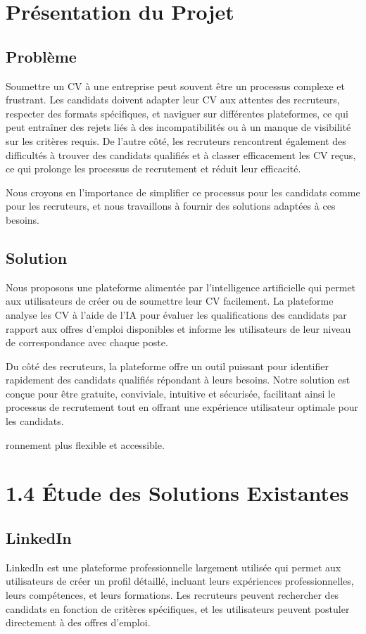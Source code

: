 \documentclass[12pt, letterpaper]{article}
\begin{document}
\section{Présentation du Projet}
\subsection{Problème}
Soumettre un CV à une entreprise peut souvent être un processus complexe et frustrant. Les candidats doivent adapter leur CV aux attentes des recruteurs, respecter des formats spécifiques, et naviguer sur différentes plateformes, ce qui peut entraîner des rejets liés à des incompatibilités ou à un manque de visibilité sur les critères requis. De l'autre côté, les recruteurs rencontrent également des difficultés à trouver des candidats qualifiés et à classer efficacement les CV reçus, ce qui prolonge les processus de recrutement et réduit leur efficacité.

Nous croyons en l'importance de simplifier ce processus pour les candidats comme pour les recruteurs, et nous travaillons à fournir des solutions adaptées à ces besoins.
\subsection{Solution}
Nous proposons une plateforme alimentée par l'intelligence artificielle qui permet aux utilisateurs de créer ou de soumettre leur CV facilement. La plateforme analyse les CV à l'aide de l'IA pour évaluer les qualifications des candidats par rapport aux offres d'emploi disponibles et informe les utilisateurs de leur niveau de correspondance avec chaque poste. 

Du côté des recruteurs, la plateforme offre un outil puissant pour identifier rapidement des candidats qualifiés répondant à leurs besoins. Notre solution est conçue pour être gratuite, conviviale, intuitive et sécurisée, facilitant ainsi le processus de recrutement tout en offrant une expérience utilisateur optimale pour les candidats.


ronnement plus flexible et accessible.
\section{\textbf{1.4 Étude des Solutions Existantes}}
\subsection{LinkedIn}
LinkedIn est une plateforme professionnelle largement utilisée qui permet aux utilisateurs de créer un profil détaillé, incluant leurs expériences professionnelles, leurs compétences, et leurs formations. Les recruteurs peuvent rechercher des candidats en fonction de critères spécifiques, et les utilisateurs peuvent postuler directement à des offres d'emploi.
\end{document}
